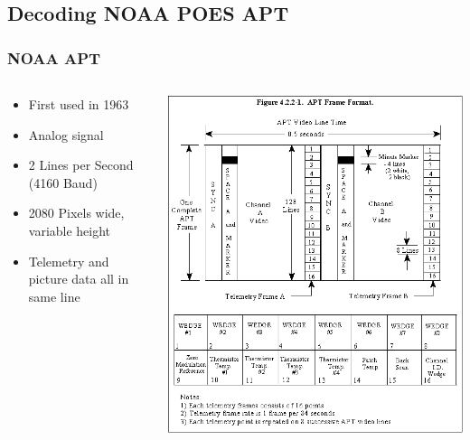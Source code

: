 \documentclass[]{beamer}
\begin{document}
\subsection{Decoding NOAA POES APT}
\begin{frame}
    \frametitle{NOAA APT}
    \begin{columns}[T]
        \begin{column}[T]{5cm}
            \begin{itemize}
                \item First used in 1963
                \item Analog signal
                \item 2 Lines per Second (4160 Baud)
                \item 2080 Pixels wide, variable height
                \item Telemetry and picture data all in same line
            \end{itemize}
        \end{column}
        \begin{column}[T]{5cm}
            \includegraphics[height=0.5\paperwidth]{images/NOAA_APT_Frame_Format.png}
        \end{column}
    \end{columns}
\end{frame}
\end{document}
